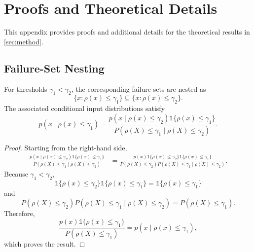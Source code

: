 \appendix

\section{Proofs and Theoretical Details}
\label{app:theory}

This appendix provides proofs and additional details for the theoretical results in \cref{sec:method}.

\subsection{Failure-Set Nesting}
\label{app:failure-nesting}

For thresholds $\gamma_1<\gamma_2$, the corresponding failure sets are nested as
\[
    \{x:\rho(x)\leq\gamma_1\}
    \subseteq
    \{x:\rho(x)\leq\gamma_2\}.
\]
The associated conditional input distributions satisfy
\[
    p(x\mid\rho(x)\leq\gamma_1)
    =
    \frac{
        p(x\mid\rho(x)\leq\gamma_2)
        \mathds{1}\{\rho(x)\leq\gamma_1\}
    }{
        P\!\left(
            \rho(X)\leq\gamma_1
            \mid
            \rho(X)\leq\gamma_2
        \right)
    }.
\]

\begin{proof}
Starting from the right-hand side,
\[
\begin{aligned}
\frac{
    p(x\mid\rho(x)\leq\gamma_2)
    \mathds{1}\{\rho(x)\leq\gamma_1\}
}{
    P(
        \rho(X)\leq\gamma_1
        \mid
        \rho(X)\leq\gamma_2
    )
}
&=
\frac{
    p(x)
    \mathds{1}\{\rho(x)\leq\gamma_2\}
    \mathds{1}\{\rho(x)\leq\gamma_1\}
}{
    P(\rho(X)\leq\gamma_2)
    P(
        \rho(X)\leq\gamma_1
        \mid
        \rho(X)\leq\gamma_2
    )
}.
\end{aligned}
\]
Because $\gamma_1<\gamma_2$,
\[
    \mathds{1}\{\rho(x)\leq\gamma_2\}
    \mathds{1}\{\rho(x)\leq\gamma_1\}
    =
    \mathds{1}\{\rho(x)\leq\gamma_1\}
\]
and
\[
    P(\rho(X)\leq\gamma_2)
    P(
        \rho(X)\leq\gamma_1
        \mid
        \rho(X)\leq\gamma_2
    )
    =
    P(\rho(X)\leq\gamma_1).
\]
Therefore,
\[
    \frac{
        p(x)\mathds{1}\{\rho(x)\leq\gamma_1\}
    }{
        P(\rho(X)\leq\gamma_1)
    }
    =
    p(x\mid\rho(x)\leq\gamma_1),
\]
which proves the result.
\end{proof}

